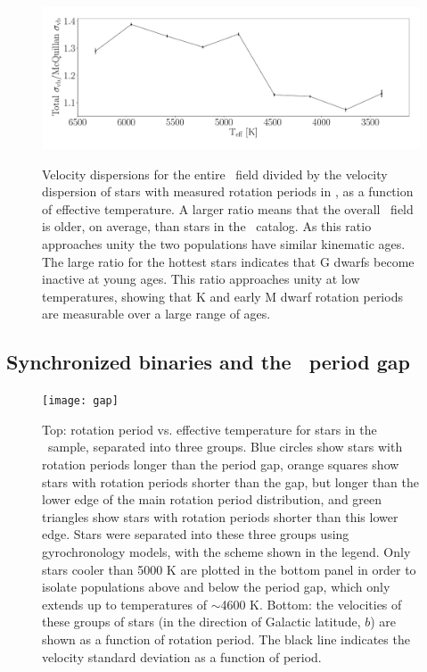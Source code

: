 \begin{figure}
  \caption{
    Velocity dispersions for the entire \kepler\ field divided by the velocity
    dispersion of stars with measured rotation periods in \mct,
    as a function of effective temperature.
    A larger ratio means that the overall \kepler\ field is older, on average,
    than stars in the \mct\ catalog.
    As this ratio approaches unity the two populations have similar kinematic
    ages.
    The large ratio for the hottest stars indicates that G dwarfs become
    inactive at young ages.
    This ratio approaches unity at low temperatures, showing that K and early
    M dwarf rotation periods are measurable over a large range of ages.
}
  \centering
    \includegraphics[width=1\textwidth]{field_comparison}
\label{fig:compare}
\end{figure}


\subsection{Synchronized binaries and the \kepler\ period gap}
\label{sec:gap}

\begin{figure}
  \caption{
      Top: rotation period vs. effective temperature for stars in the \mct\
    sample, separated into three groups. Blue circles
      show stars with rotation periods longer than the
    period gap, orange squares show stars with rotation periods shorter than
    the gap, but longer than the lower edge of the main rotation period
    distribution, and green triangles show stars with rotation periods shorter
    than this lower edge.
    Stars were separated into these three groups using \citet{angus2019}
    gyrochronology models, with the scheme shown in the legend.
    Only stars cooler than 5000 K are plotted in
    the bottom panel in order to isolate populations above and below the
    period gap, which only extends up to temperatures of $\sim$4600 K.
    Bottom: the velocities of these groups of stars (in the direction of
    Galactic latitude, $b$) are shown as a function of rotation period.
    The black line indicates the velocity standard deviation as a function of
    period.
}
  \centering
    \texttt{[image: gap]}
\label{fig:gap}
\end{figure}

